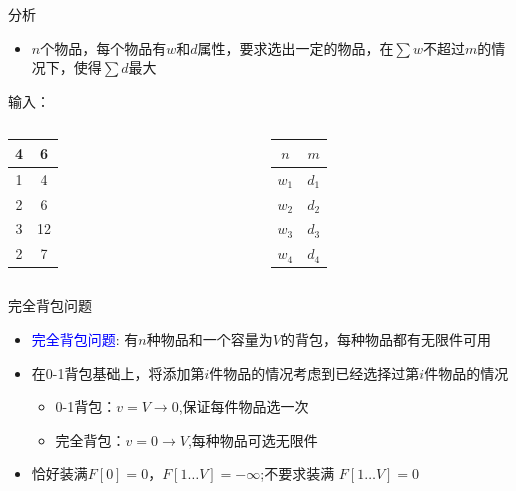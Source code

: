 \begin{frame}{分析}
    \begin{itemize}
        \item $n$个物品，每个物品有$w$和$d$属性，要求选出一定的物品，在$\sum w$不超过$m$的情况下，使得$\sum d$最大
    \end{itemize}
    \vfill
    \begin{exampleblock}{输入：}
        \begin{columns}
            \begin{table}
                \begin{tabular}{cc}
                4 & 6 \\\hline
                \alert{1} & \alert{4} \\\hline
                2 & 6 \\\hline
                \alert{3} & \alert{12} \\\hline
                \alert{2} & \alert{7} \\\hline
                \end{tabular}
            \end{table}
            \begin{table}
                \begin{tabular}{cc}
                $n$ & $m$ \\\hline
                $w_1$ & $d_1$ \\\hline
                $w_2$ & $d_2$ \\\hline
                $w_3$ & $d_3$ \\\hline
                $w_4$ & $d_4$ \\\hline
                \end{tabular}
            \end{table}
        \end{columns}
    \end{exampleblock}
\end{frame}    
\begin{frame}{完全背包问题}
    \begin{itemize}
        \item \textcolor{blue}{完全背包问题}: 有$n$种物品和一个容量为$V$的背包，每种物品都有无限件可用
        \vfill
        \item 在0-1背包基础上，将添加第$i$件物品的情况考虑到已经选择过第$i$件物品的情况
        \begin{itemize}                
            \item 0-1背包：$v=V\rightarrow 0$,保证每件物品选一次
            \item 完全背包：$v=0\rightarrow V$,每种物品可选无限件
        \end{itemize}
        \vfill
        \item 恰好装满$F[0]=0$，$F[1\ldots V]=-\infty$;不要求装满 $F[1\ldots V]=0$
    \end{itemize}
\end{frame}       
